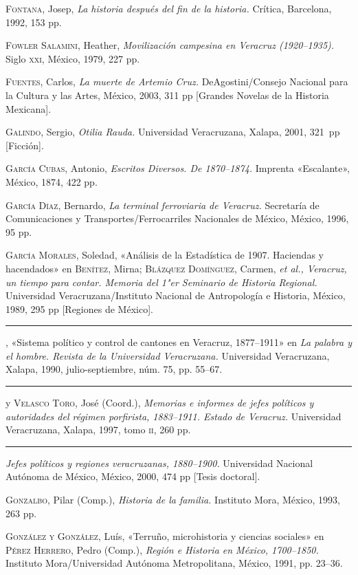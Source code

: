 \documentclass[14pt,twoside,final]{extbook} %
\begin{document}
\textsc{Fontana}, Josep, \emph{La historia después del fin de la historia.} Crítica, Barcelona, 1992, 153 pp.

\textsc{Fowler Salamini}, Heather, \emph{Movilización campesina en Veracruz (1920--1935).} Siglo \textsc{xxi}, México, 1979, 227 pp.

\textsc{Fuentes}, Carlos, \emph{La muerte de Artemio Cruz.} DeAgostini/Consejo Nacional para la Cultura y las Artes, México, 2003, 311 pp [Grandes Novelas de la Historia Mexicana].

\textsc{Galindo}, Sergio, \emph{Otilia Rauda.} Universidad Veracruzana, Xalapa, 2001, 321~pp [Ficción].

\textsc{García Cubas}, Antonio, \emph{Escritos Diversos. De 1870--1874.} Imprenta «Escalante», México, 1874, 422 pp. \pagebreak[4]

\textsc{García Díaz}, Bernardo, \emph{La terminal ferroviaria de Veracruz.} Secretaría de Comunicaciones y Transportes/Ferrocarriles Nacionales de México, México, 1996, 95 pp.

\textsc{García Morales}, Soledad, «Análisis de la Estadística de 1907. Haciendas y hacendados» en \textsc{Benítez}, Mirna; \textsc{Blázquez Domínguez}, Carmen, \emph{et al., Veracruz, un tiempo para contar. Memoria del 1"er Seminario de Historia Regional.} Universidad Veracruzana/Instituto Nacional de Antropología e Historia, México, 1989, 295 pp [Regiones de México].

\rule{1cm}{0.4pt}, «Sistema político y control de cantones en Veracruz, 1877--1911» en \emph{La palabra y el hombre. Revista de la Universidad Veracruzana.} Universidad Veracruzana, Xalapa, 1990, julio-septiembre, núm. 75, pp. 55--67.

\rule{1cm}{0.4pt} y \textsc{Velasco Toro}, José (Coord.), \emph{Memorias e informes de jefes políticos y autoridades del régimen porfirista, 1883--1911. Estado de Veracruz.} Universidad Veracruzana, Xalapa, 1997, tomo \textsc{ii}, 260 pp.

\rule{1cm}{0.4pt} \emph{Jefes políticos y regiones veracruzanas, 1880--1900.} Universidad Nacional Autónoma de México, México, 2000, 474 pp [Tesis doctoral].

\textsc{Gonzalbo}, Pilar (Comp.), \emph{Historia de la familia.} Instituto Mora, México, 1993, 263 pp.

\textsc{González y González}, Luís, «Terruño, microhistoria y ciencias sociales» en \textsc{Pérez Herrero}, Pedro (Comp.), \emph{Región e Historia en México, \mbox{1700--1850}.} Instituto Mora/Universidad Autónoma Metropolitana, México, 1991, pp. 23--36.
\end{document}

